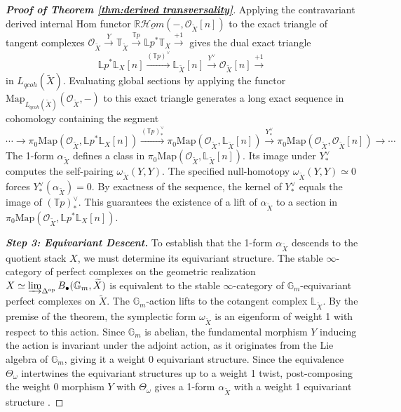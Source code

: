 \documentclass[reqno]{amsart}
\theoremstyle{definition}
\theoremstyle{remark}
\newcommand{\LL}{\mathbb{L}}
\newcommand{\TT}{\mathbb{T}}
\newcommand{\Gm}{\mathbb{G}_m}
\newcommand{\cO}{\mathcal{O}}
\begin{document}
{\begin{proof}[\textbf{Proof of Theorem \ref{thm:derived transversality}}]
  Applying the contravariant derived internal Hom functor
  $\mathbb{R}\underline{\mathcal{H}om}( - , \cO_{\widetilde{X}}[n])$
  to the exact triangle of tangent complexes $\cO_{\widetilde{X}} \xrightarrow{Y}
  \TT_{\widetilde{X}} \xrightarrow{\mathbb{T}p} \mathbb{L}p^*\TT_X \xrightarrow{+1}$
  gives the dual exact triangle 
  \begin{equation*}
    \mathbb{L}p^*\LL_X[n] \xrightarrow{(\mathbb{T}p)^\vee}
    \LL_{\widetilde{X}}[n] \xrightarrow{Y^\vee} \cO_{\widetilde{X}}[n] \xrightarrow{+1}
  \end{equation*}
  in $L_{qcoh}(\widetilde{X})$.
  Evaluating global sections by applying the functor $\mathrm{Map}_{L_{qcoh}(\widetilde{X})}(\cO_{\widetilde{X}}, -)$ to this exact triangle generates a long exact sequence in cohomology containing the segment
  \begin{equation*}
    \cdots \to \pi_0 \mathrm{Map}(\cO_{\widetilde{X}}, \mathbb{L}p^*\LL_X[n]) \xrightarrow{(\mathbb{T}p)^\vee_*} \pi_0 \mathrm{Map}(\cO_{\widetilde{X}}, \LL_{\widetilde{X}}[n]) \xrightarrow{Y^\vee_*} \pi_0 \mathrm{Map}(\cO_{\widetilde{X}}, \cO_{\widetilde{X}}[n]) \to \cdots
  \end{equation*}
  The 1-form $\alpha_{\widetilde{X}}$ defines a class in $\pi_0 \mathrm{Map}(\cO_{\widetilde{X}}, \LL_{\widetilde{X}}[n])$. Its image under $Y^\vee_*$ computes the self-pairing $\omega_{\widetilde{X}}(Y, Y)$. The specified null-homotopy $\omega_{\widetilde{X}}(Y, Y) \simeq 0$ forces $Y^\vee_*(\alpha_{\widetilde{X}}) = 0$. By exactness of the sequence, the kernel of $Y^\vee_*$ equals the image of $(\mathbb{T}p)^\vee_*$. This guarantees the existence of a lift of $\alpha_{\widetilde{X}}$ to a section in $\pi_0 \mathrm{Map}(\cO_{\widetilde{X}}, \mathbb{L}p^* \LL_X[n])$.
\vspace{5pt}

  \textbf{\textit{Step 3: Equivariant Descent.}}
  To establish that the 1-form $\alpha_{\widetilde{X}}$ descends to the quotient stack $X$, we must determine its equivariant structure. The stable $\infty$-category of perfect complexes on the geometric realization $X \simeq \varinjlim_{\Delta^{\mathrm{op}}} B_\bullet(\Gm, \widetilde{X})$ is equivalent to the stable $\infty$-category of $\Gm$-equivariant perfect complexes on $\widetilde{X}$. The $\Gm$-action lifts to the cotangent complex $\LL_{\widetilde{X}}$. 
  By the premise of the theorem, the symplectic form $\omega_{\widetilde{X}}$ is an eigenform of weight 1 with respect to this action. Since $\Gm$ is abelian, the fundamental morphism $Y$ inducing the action is invariant under the adjoint action, as it originates from the Lie algebra of $\Gm$, giving it a weight 0 equivariant structure. Since the equivalence $\Theta_\omega$ intertwines the equivariant structures up to a weight 1 twist, post-composing the weight 0 morphism $Y$ with $\Theta_\omega$ gives a 1-form $\alpha_{\widetilde{X}}$ with a weight 1 equivariant structure \cite[Section 1.2]{PTVV}.


\end{proof}}
\end{document}
